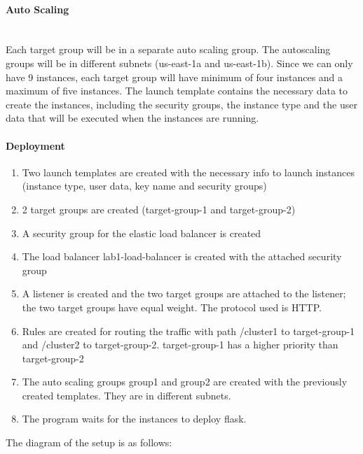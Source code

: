 \documentclass[11pt]{article}
\begin{document}
\paragraph{Auto Scaling}\mbox{}\\
Each target group will be in a separate auto scaling group. The autoscaling groups will be in different subnets (us-east-1a and us-east-1b). Since we can only have 9 instances, each target group will have minimum of four instances and a maximum of five instances. The launch template contains the necessary data to create the instances, including the security groups, the instance type and the user data that will be executed when the instances are running.

\paragraph{Deployment}
\begin{enumerate}
    \item Two launch templates are created with the necessary info to launch instances (instance type, user data, key name and security groups)
    \item 2 target groups are created (target-group-1 and target-group-2)
    \item A security group for the elastic load balancer is created
    \item The load balancer lab1-load-balancer is created with the attached security group
    \item A listener is created and the two target groups are attached to the listener; the two target groups have equal weight. The protocol used is HTTP.
    \item Rules are created for routing the traffic with path /cluster1 to target-group-1 and /cluster2 to target-group-2. target-group-1 has a higher priority than target-group-2
    \item The auto scaling groups group1 and group2 are created with the previously created templates. They are in different subnets.
    \item The program waits for the instances to deploy flask.
\end{enumerate}
The diagram of the setup is as follows:\\
\end{document}
